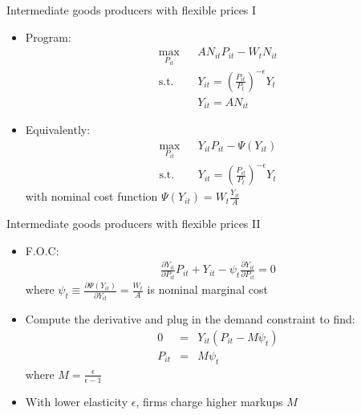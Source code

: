 \documentclass[9pt,xcolor={dvipsnames}]{beamer}
\newcommand{\bit}{\begin{itemize}}
\newcommand{\eit}{\end{itemize}}
\begin{document}
\begin{frame}{Intermediate goods producers with flexible prices I}

\bit
\setlength\itemsep{2em}

\item Program:
\begin{eqnarray}
\max_{P_{it}} && A N_{it} P_{it}- W_t N_{it} \nonumber \\
\text{s.t.} && Y_{it} = \left(\frac{P_{it}}{P_t}\right)^{-\epsilon} Y_t \nonumber \\
&& Y_{it} = A N_{it} \nonumber
\end{eqnarray}

\item Equivalently:
\begin{eqnarray}
\max_{P_{it}} && Y_{it} P_{it}-\Psi(Y_{it}) \nonumber \\
\text{s.t.} && Y_{it} = \left(\frac{P_{it}}{P_t}\right)^{-\epsilon} Y_t \nonumber
\end{eqnarray}
with nominal cost function $\Psi(Y_{it}) = W_{t} \frac{Y_{it}}{A}$

\eit

\end{frame}


\begin{frame}{Intermediate goods producers with flexible prices II}

\bit
\setlength\itemsep{1.5em}

\item F.O.C:
\begin{eqnarray}
\frac{\partial Y_{it}}{\partial P_{it}} P_{it} + Y_{it} - \psi_t \frac{\partial Y_{it}}{\partial P_{it}}  = 0 \nonumber
\end{eqnarray}
where $\psi_t  \equiv \frac{\partial \Psi(Y_{it})}{\partial Y_{it}} = \frac{W_{t}}{A}$ is nominal marginal cost

\item Compute the derivative and plug in the demand constraint to find:
\begin{eqnarray}
0 &=& Y_{it} (P_{it}-M\psi_t) \nonumber \\
P_{it} &=& M \psi_t \nonumber
\end{eqnarray}
where $M = \frac{\epsilon}{\epsilon-1}$

\item With lower elasticity $\epsilon$, firms charge higher markups $M$

\eit

\end{frame}
\end{document}
